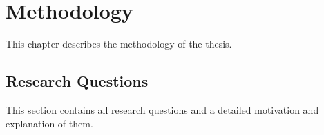 \chapter{Methodology}\label{ch:methodology}

This chapter describes the methodology of the thesis.

\section{Research Questions}
This section contains all research questions and a detailed motivation and explanation of them.
